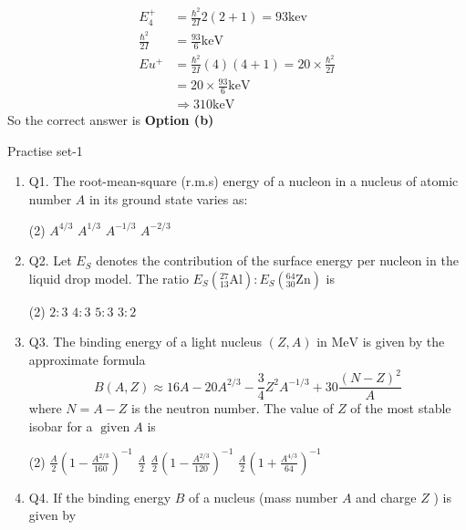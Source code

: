 \begin{answer}
	\begin{align*}
	E_{4}^{+}&=\frac{\hbar^{2}}{2 I} 2(2+1)=93 \mathrm{kev} \\
	\frac{\hbar^{2}}{2 I}&=\frac{93}{6} \mathrm{keV}\\
	E u^{+}&=\frac{\hbar^{2}}{2 I}(4)(4+1)=20 \times \frac{\hbar^{2}}{2 I}\\
	&=20 \times \frac{93}{6} \mathrm{keV} \\
	&\Rightarrow 310 \mathrm{keV}
	\end{align*}
	So the correct answer is \textbf{Option (b)}
\end{answer}
\newpage
\begin{abox}
	Practise set-1
\end{abox}
\begin{enumerate}
	\item Q1. The root-mean-square (r.m.s) energy of a nucleon in a nucleus of atomic number $A$ in its ground state varies as:
	 \begin{tasks}(2)
		\task[\textbf{a.}]$A^{4 / 3}$
		\task[\textbf{b.}]$A^{1 / 3}$
		\task[\textbf{c.}]$A^{-1 / 3}$
		\task[\textbf{d.}]$A^{-2 / 3}$ 
	\end{tasks}
	\item Q2. Let $E_S$ denotes the contribution of the surface energy per nucleon in the liquid drop model. The ratio $E_S\left({ }_{13}^{27} \mathrm{Al}\right): E_S\left({ }_{30}^{64} \mathrm{Zn}\right)$ is
	{}
	 \begin{tasks}(2)
		\task[\textbf{a.}]$2: 3$
		\task[\textbf{b.}]$4: 3$
		\task[\textbf{c.}]$5: 3$
		\task[\textbf{d.}]$3: 2$ 
	\end{tasks}
	\item Q3. The binding energy of a light nucleus $(Z, A)$ in $\mathrm{MeV}$ is given by the approximate formula
	$$
	B(A, Z) \approx 16 A-20 A^{2 / 3}-\frac{3}{4} Z^2 A^{-1 / 3}+30 \frac{(N-Z)^2}{A}
	$$
	where $N=A-Z$ is the neutron number. The value of $Z$ of the most stable isobar for a $\operatorname{given} A$ is
	{}
 \begin{tasks}(2)
	\task[\textbf{a.}] $\frac{A}{2}\left(1-\frac{A^{2 / 3}}{160}\right)^{-1}$
	\task[\textbf{b.}]$\frac{A}{2}$
	\task[\textbf{c.}]$\frac{A}{2}\left(1-\frac{A^{2 / 3}}{120}\right)^{-1}$
	\task[\textbf{d.}] $\frac{A}{2}\left(1+\frac{A^{4 / 3}}{64}\right)^{-1}$
\end{tasks}
	\item Q4. If the binding energy $B$ of a nucleus (mass number $A$ and charge $Z$ ) is given by

\end{enumerate}

